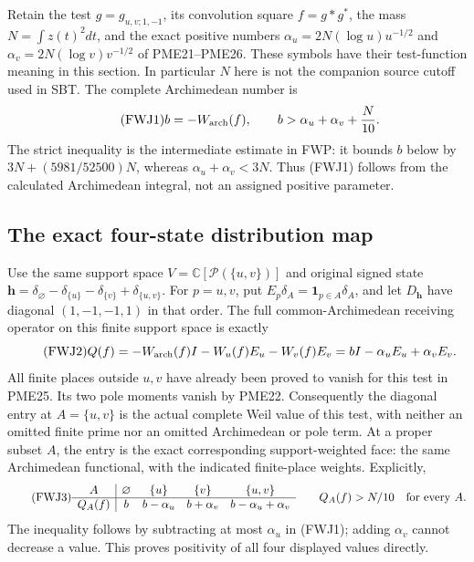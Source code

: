 \documentclass[11pt]{article}
\begin{document}
Retain the test $g=g_{u,v;1,-1}$, its convolution square $f=g*g^*$,
the mass $N=\int z(t)^2dt$, and the exact positive numbers
$\alpha_u=2N(\log u)u^{-1/2}$ and
$\alpha_v=2N(\log v)v^{-1/2}$ of PME21--PME26. These symbols have
their test-function meaning in this section. In particular $N$ here
is not the companion source cutoff used in SBT. The complete
Archimedean number is
\begin{equation}\tag{FWJ1}
 b=-W_{\rm arch}(f),\qquad
 b>\alpha_u+\alpha_v+\frac{N}{10}.
\end{equation}
The strict inequality is the intermediate estimate in FWP: it bounds
$b$ below by $3N+(5981/52500)N$, whereas
$\alpha_u+\alpha_v<3N$. Thus (FWJ1) follows from the calculated
Archimedean integral, not an assigned positive parameter.

\subsection{The exact four-state distribution map}

Use the same support space
$V=\mathbb C[\mathcal P(\{u,v\})]$ and original signed state
$\mathbf h=\delta_\varnothing-\delta_{\{u\}}
-\delta_{\{v\}}+\delta_{\{u,v\}}$.
For $p=u,v$, put $E_p\delta_A=\mathbf1_{p\in A}\delta_A$,
and let $D_{\mathbf h}$ have diagonal $(1,-1,-1,1)$ in that order.
The full common-Archimedean receiving operator on this finite support
space is exactly
\begin{equation}\tag{FWJ2}
 Q(f)=-W_{\rm arch}(f)I-W_u(f)E_u-W_v(f)E_v
     =bI-\alpha_u E_u+\alpha_v E_v .
\end{equation}
All finite places outside $u,v$ have already been proved to vanish
for this test in PME25. Its two pole moments vanish by PME22.
Consequently the diagonal entry at $A=\{u,v\}$ is the actual
complete Weil value of this test, with neither an omitted finite
prime nor an omitted Archimedean or pole term. At a proper subset
$A$, the entry is the exact corresponding support-weighted face:
the same Archimedean functional, with the indicated finite-place
weights. Explicitly,
\begin{equation}\tag{FWJ3}
 \begin{array}{c|cccc}
 A&\varnothing&\{u\}&\{v\}&\{u,v\}\\\hline
 Q_A(f)&b&b-\alpha_u&b+\alpha_v&b-\alpha_u+\alpha_v
 \end{array}
 \qquad Q_A(f)>N/10\quad\hbox{for every }A.
\end{equation}
The inequality follows by subtracting at most $\alpha_u$ in
(FWJ1); adding $\alpha_v$ cannot decrease a value.
This proves positivity of all four displayed values directly.
\end{document}
